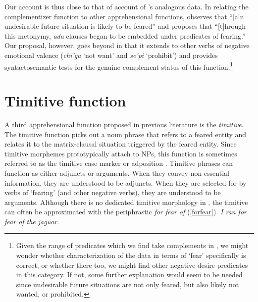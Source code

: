 \documentclass[output=paper,colorlinks,citecolor=brown]{langscibook}
\begin{document}
Our account is thus close to that of  account of 's analogous data. In relating the complementizer function to other apprehensional functions, \citet[305]{lichtenberk1995apprehensional} observes that ``[a]n undesirable future situation is likely to be feared'' and proposes that ``[t]hrough this metonymy, \textit{ada} clauses began to be embedded under predicates of fearing.'' Our proposal, however, goes beyond  in that it extends to other verbs of negative emotional valence (\ie \emph{chi'ga} `not want' and \emph{se'pi} `prohibit') and provides syntactosemantic tests for the genuine complement status of this function.\footnote{Given the range of predicates which we find take  complements in , we might wonder whether  characterization of the  data in terms of `fear' specifically is correct, or whether there too, we might find other negative desire predicates in this category. If not, some further explanation would seem to be needed since undesirable future situations are not only feared, but also likely not wanted, or prohibited.}




\section{Timitive function} \label{sec:timitivefunction}

A third apprehensional function proposed in previous literature is the \emph{timitive}. The timitive function picks out a noun phrase that refers to a feared entity and relates it to the matrix-clausal situation triggered by the feared entity. Since timitive morphemes prototypically attach to NPs, this function is sometimes referred to as the timitive case marker or adposition \citep{vuillermet2018a, VuillermetM2018questionnaire}. Timitive phrases can function as either adjuncts or arguments. When they convey non-essential information, they are understood to be adjuncts. When they are selected for by verbs of `fearing' (and other negative verbs), they are understood to be arguments. Although there is no dedicated timitive morphology in , the timitive can often be approximated with the periphrastic \emph{for fear of} (\ref{forfear}).
    \ea \label{forfear}
    \glt \textit{I ran for fear of the jaguar}.
    \z
\end{document}
